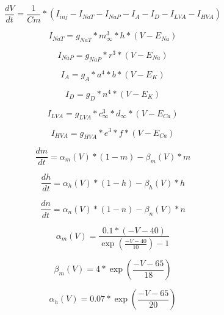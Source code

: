 \begin{equation}
\frac{dV}{dt} = \frac{1}{Cm} * (I_{inj} - I_{NaT} - I_{NaP} - I_{A} - I_{D} - I_{LVA} - I_{HVA} )
\end{equation}

\begin{equation}
I_{NaT} = g_{NaT} * m_{\infty}^3 * h * (V - E_{Na})
\end{equation}

\begin{equation}
I_{NaP} = g_{NaP} * r^3 * (V - E_{Na})
\end{equation}

\begin{equation}
I_{A} = g_{A} * a^4 * b * (V - E_{K})
\end{equation}

\begin{equation}
I_{D} = g_{D} * n^4 * (V - E_{K})
\end{equation}

\begin{equation}
I_{LVA} = g_{LVA} * c_{\infty}^3 * d_{\infty} * (V - E_{Ca})
\end{equation}

\begin{equation}
I_{HVA} = g_{HVA} * e^3 * f * (V - E_{Ca})
\end{equation}

\begin{equation}
\frac{dm}{dt} = \alpha_{m}(V)*(1 - m) - \beta_{m}(V)*m
\end{equation}

\begin{equation}
\frac{dh}{dt} = \alpha_{h}(V)*(1 - h) - \beta_{h}(V)*h
\end{equation}

\begin{equation}
\frac{dn}{dt} = \alpha_{n}(V)*(1 - n) - \beta_{n}(V)*n
\end{equation}

\begin{equation}
\alpha_{m}(V) = \frac{0.1 * (-V - 40)}{\exp(\frac{-V - 40}{10}) - 1}
\end{equation}

\begin{equation}
\beta_m(V) = 4 * \exp(\frac{-V - 65}{18})
\end{equation}

\begin{equation}
\alpha_h(V) = 0.07 * \exp(\frac{-V - 65}{20})
\end{equation}

